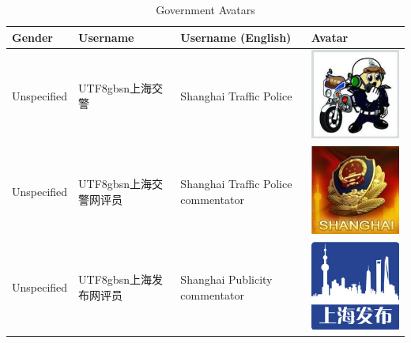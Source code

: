 \documentclass[11pt]{article}
\newcommand{\zh}[1]{\begin{CJK*}{UTF8}{gbsn}#1\end{CJK*}}
\begin{document}
\begin{table}[H]
  \singlespacing
  \centering
  \caption{Government Avatars}
  \begin{tabular}{|p{}|p{}|p{}|p{}|}
	\hline
	\textbf{Gender} & \textbf{Username} & \textbf{Username (English)} & \textbf{Avatar} \\ \hline
	Unspecified & \zh{上海交警} & Shanghai Traffic Police & \begin{minipage}{.2\textwidth}\includegraphics[width=.5\linewidth, height=.5\linewidth]{figures/govt_avatars/1.jpg}\end{minipage} \\ \hline
	Unspecified & \zh{上海交警网评员} & Shanghai Traffic Police commentator & \begin{minipage}{.2\textwidth}\includegraphics[width=.5\linewidth, height=.5\linewidth]{figures/govt_avatars/2.jpg}\end{minipage} \\ \hline
	Unspecified & \zh{上海发布网评员} & Shanghai Publicity commentator & \begin{minipage}{.2\textwidth}\includegraphics[width=.5\linewidth, height=.5\linewidth]{figures/govt_avatars/3.jpg}\end{minipage} \\ \hline

\end{tabular}
\end{table}
\end{document}
